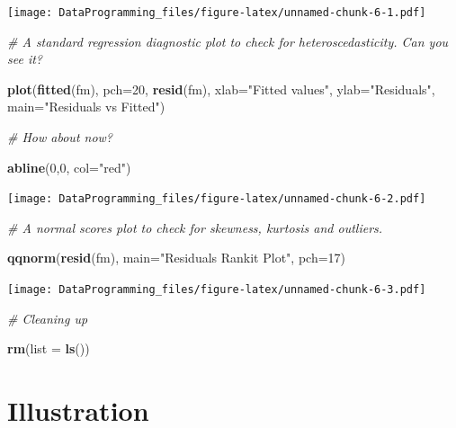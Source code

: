 \documentclass[]{book}
\newenvironment{Shaded}{\begin{snugshade}}{\end{snugshade}}
\newcommand{\CommentTok}[1]{\textcolor[rgb]{0.56,0.35,0.01}{\textit{#1}}}
\newcommand{\DataTypeTok}[1]{\textcolor[rgb]{0.13,0.29,0.53}{#1}}
\newcommand{\DecValTok}[1]{\textcolor[rgb]{0.00,0.00,0.81}{#1}}
\newcommand{\KeywordTok}[1]{\textcolor[rgb]{0.13,0.29,0.53}{\textbf{#1}}}
\newcommand{\NormalTok}[1]{#1}
\newcommand{\StringTok}[1]{\textcolor[rgb]{0.31,0.60,0.02}{#1}}
\begin{document}
\texttt{[image: DataProgramming\_files/figure-latex/unnamed-chunk-6-1.pdf]}

\begin{Shaded}
\begin{Highlighting}[]
\CommentTok{# A standard regression diagnostic plot to check for heteroscedasticity. Can you see it?}

\KeywordTok{plot}\NormalTok{(}\KeywordTok{fitted}\NormalTok{(fm), }\DataTypeTok{pch=}\DecValTok{20}\NormalTok{, }\KeywordTok{resid}\NormalTok{(fm), }\DataTypeTok{xlab=}\StringTok{"Fitted values"}\NormalTok{, }\DataTypeTok{ylab=}\StringTok{"Residuals"}\NormalTok{, }\DataTypeTok{main=}\StringTok{"Residuals vs Fitted"}\NormalTok{)}

\CommentTok{# How about now?}

\KeywordTok{abline}\NormalTok{(}\DecValTok{0}\NormalTok{,}\DecValTok{0}\NormalTok{, }\DataTypeTok{col=}\StringTok{"red"}\NormalTok{)  }
\end{Highlighting}
\end{Shaded}

\texttt{[image: DataProgramming\_files/figure-latex/unnamed-chunk-6-2.pdf]}

\begin{Shaded}
\begin{Highlighting}[]
\CommentTok{# A normal scores plot to check for skewness, kurtosis and outliers.}

\KeywordTok{qqnorm}\NormalTok{(}\KeywordTok{resid}\NormalTok{(fm), }\DataTypeTok{main=}\StringTok{"Residuals Rankit Plot"}\NormalTok{, }\DataTypeTok{pch=}\DecValTok{17}\NormalTok{)}
\end{Highlighting}
\end{Shaded}

\texttt{[image: DataProgramming\_files/figure-latex/unnamed-chunk-6-3.pdf]}

\begin{Shaded}
\begin{Highlighting}[]
\CommentTok{# Cleaning up}

\KeywordTok{rm}\NormalTok{(}\DataTypeTok{list =} \KeywordTok{ls}\NormalTok{())}
\end{Highlighting}
\end{Shaded}

\hypertarget{illustration}{%
\section{Illustration}\label{illustration}}
\end{document}
